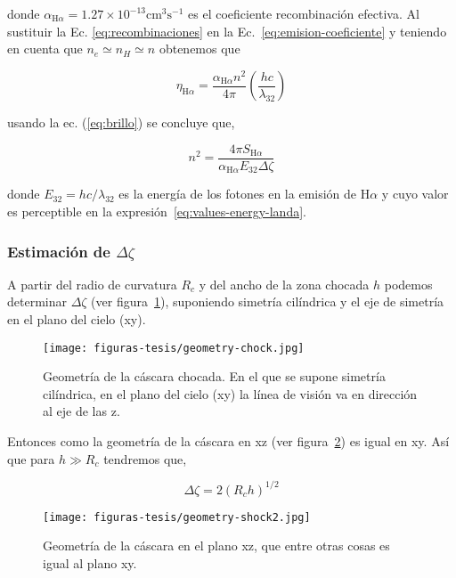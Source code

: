 \documentclass{article}
\newcommand\U[1]{\ensuremath{\mathrm{#1}}}
\newcommand\cm{\U{cm}}
\newcommand\ha{\ensuremath{\mathrm{H}\alpha}}
\begin{document}
donde  \(\alpha_{\ha}=1.27\times 10^{-13}\cm^{3} \text{s}^{-1} \) es el coeficiente recombinación efectiva. Al sustituir la Ec. \ref{eq:recombinaciones} en la Ec.~\ref{eq:emision-coeficiente} y teniendo en cuenta que \(n_{e}\simeq n_{H} \simeq n\) obtenemos que

\begin{equation*}
 \eta_{\ha} =  \frac{\alpha_{\ha}n^{2}}{4\pi} \left(\frac{hc}{\lambda_{32}}\right)  
\end{equation*}

 usando la ec. (\ref{eq:brillo}) se concluye que,

\begin{equation}
  \label{eq:densidad}
  n^{2}=\frac{4 \pi S_{\ha}}{\alpha_{\ha} E_{32} \Delta \zeta}
\end{equation}

\noindent donde \( E_{32} = hc/\lambda_{32}\)  es la energía de los fotones en la emisión de \ha{} y cuyo valor es perceptible en la expresión~\ref{eq:values-energy-landa}. 

\subsubsection{Estimación de \(\Delta \zeta\)}
\label{sec:camino}

A partir del radio de curvatura \(R_{c}\) y del ancho de la zona chocada \(h\) podemos determinar \(\Delta \zeta\) (ver figura~\ref{fig:geometria}), suponiendo simetría cilíndrica y el eje de simetría en el plano del cielo (xy).\\

\begin{figure}
  \centering
  \texttt{[image: figuras-tesis/geometry-chock.jpg]}
  \caption{Geometría de la cáscara chocada. En el que se supone simetría cilíndrica, en el plano del cielo (xy) la línea de visión va en dirección al eje de las z. }
  \label{fig:geometria}
\end{figure}

Entonces como la geometría de la cáscara en xz (ver figura~\ref{fig:geometria1}) es igual en xy. Así que para \(h \gg R_{c}\) tendremos que,

\begin{equation}
  \label{eq:vision}
  \Delta \zeta = 2(R_{c}h)^{1/2}
\end{equation}

\begin{figure}
  \centering
  \texttt{[image: figuras-tesis/geometry-shock2.jpg]}
  \caption{Geometría de la cáscara en el plano xz, que entre otras cosas es igual al plano xy.}
  \label{fig:geometria1}
\end{figure}
\end{document}
